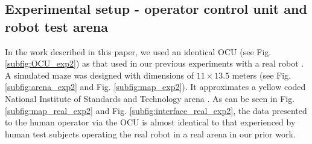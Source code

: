 \documentclass[a4paper,12pt,oneside,openright]{bhamthesis}
\begin{document}
\subsection{Experimental setup - operator control unit and robot test arena}
	
In the work described in this paper, we used an identical OCU (see Fig. \ref{subfig:OCU_exp2}) as that used in our previous experiments with a real robot \citep{Chiou2015}. A simulated maze was designed with dimensions of  $11 \times 13.5$ meters (see Fig. \ref{subfig:arena_exp2} and Fig. \ref{subfig:map_exp2}). It approximates a yellow coded National Institute of Standards and Technology arena \citep{Jacoff2003a}. As can be seen in Fig. \ref{subfig:map_real_exp2} and Fig. \ref{subfig:interface_real_exp2}, the data presented to the human operator via the OCU is almost identical to that experienced by human test subjects operating the real robot in a real arena in our prior work.
	
\end{document}
